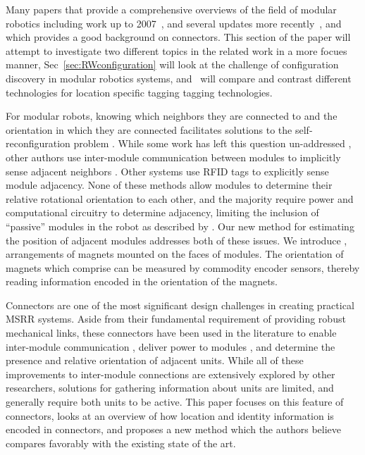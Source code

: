 
Many papers that provide a comprehensive overviews of the field of modular robotics including work up to 2007~\cite{Yim-RAM07}, and several updates more recently~\cite{chennareddy2017modular}, and which provides a good background on connectors. This section of the paper will attempt to investigate two different topics in the related work in a more focues manner, Sec~\ref{sec:RWconfiguration} will look at the challenge of configuration discovery in modular robotics systems, and~\label{sec:RWtaggingTech} will compare and contrast different technologies for location specific tagging tagging technologies.

For modular robots, knowing which neighbors they are connected to and the orientation in which they are connected facilitates solutions to the self-reconfiguration problem \cite{AHMADZADEH201527} \cite{Yim-RAM07}. While some work has left this question un-addressed \cite{Soldercubes2016}, other authors use inter-module communication between modules to implicitly sense adjacent neighbors \cite{liedke2013collective} \cite{Gilpin-Thesis06} \cite{TosunDaveyLiuYim-IROS2016}.  Other systems use RFID tags \cite{Werfel-PhDThesis06} to explicitly sense module adjacency.  None of these methods allow modules to determine their relative rotational orientation to each other, and the majority require power and computational circuitry to determine adjacency, limiting the inclusion of ``passive'' modules in the robot as described by \cite{roombots-Bonardi-2013}.  Our new method for estimating the position of adjacent modules addresses both of these issues.  We introduce \tagNamePlural, arrangements of magnets mounted on the faces of modules.  The orientation of magnets which comprise \tagNamePlural can be measured by commodity encoder sensors, thereby reading information encoded in the orientation of the magnets.

Connectors are one of the most significant design challenges in creating practical MSRR systems. Aside from their fundamental requirement of providing robust mechanical links, these connectors have been used in the literature to enable inter-module communication \cite{liedke2013collective} \cite{TosunDaveyLiuYim-IROS2016}, deliver power to modules \cite{OptimalPowerSharing2016}, and determine the presence and relative orientation of adjacent units. While all of these improvements to inter-module connections are extensively explored by other researchers, solutions for gathering information about units are limited, and generally require both units to be active.  This paper focuses on this feature of connectors, looks at an overview of how location and identity information is encoded in connectors, and proposes a new method which the authors believe compares favorably with the existing state of the art.

